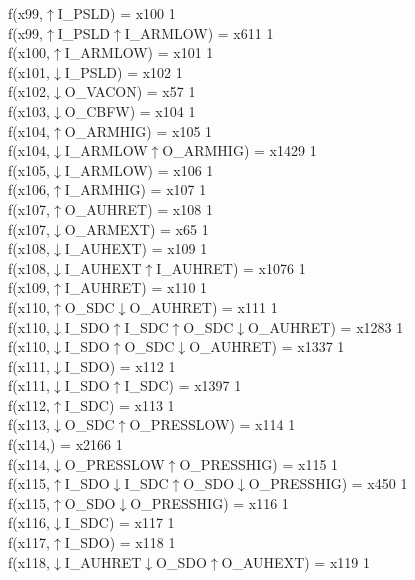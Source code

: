 f(x99,$\uparrow$I\_PSLD) = x100 {1} \\
f(x99,$\uparrow$I\_PSLD$\uparrow$I\_ARMLOW) = x611 {1} \\
f(x100,$\uparrow$I\_ARMLOW) = x101 {1} \\
f(x101,$\downarrow$I\_PSLD) = x102 {1} \\
f(x102,$\downarrow$O\_VACON) = x57 {1} \\
f(x103,$\downarrow$O\_CBFW) = x104 {1} \\
f(x104,$\uparrow$O\_ARMHIG) = x105 {1} \\
f(x104,$\downarrow$I\_ARMLOW$\uparrow$O\_ARMHIG) = x1429 {1} \\
f(x105,$\downarrow$I\_ARMLOW) = x106 {1} \\
f(x106,$\uparrow$I\_ARMHIG) = x107 {1} \\
f(x107,$\uparrow$O\_AUHRET) = x108 {1} \\
f(x107,$\downarrow$O\_ARMEXT) = x65 {1} \\
f(x108,$\downarrow$I\_AUHEXT) = x109 {1} \\
f(x108,$\downarrow$I\_AUHEXT$\uparrow$I\_AUHRET) = x1076 {1} \\
f(x109,$\uparrow$I\_AUHRET) = x110 {1} \\
f(x110,$\uparrow$O\_SDC$\downarrow$O\_AUHRET) = x111 {1} \\
f(x110,$\downarrow$I\_SDO$\uparrow$I\_SDC$\uparrow$O\_SDC$\downarrow$O\_AUHRET) = x1283 {1} \\
f(x110,$\downarrow$I\_SDO$\uparrow$O\_SDC$\downarrow$O\_AUHRET) = x1337 {1} \\
f(x111,$\downarrow$I\_SDO) = x112 {1} \\
f(x111,$\downarrow$I\_SDO$\uparrow$I\_SDC) = x1397 {1} \\
f(x112,$\uparrow$I\_SDC) = x113 {1} \\
f(x113,$\downarrow$O\_SDC$\uparrow$O\_PRESSLOW) = x114 {1} \\
f(x114,) = x2166 {1} \\
f(x114,$\downarrow$O\_PRESSLOW$\uparrow$O\_PRESSHIG) = x115 {1} \\
f(x115,$\uparrow$I\_SDO$\downarrow$I\_SDC$\uparrow$O\_SDO$\downarrow$O\_PRESSHIG) = x450 {1} \\
f(x115,$\uparrow$O\_SDO$\downarrow$O\_PRESSHIG) = x116 {1} \\
f(x116,$\downarrow$I\_SDC) = x117 {1} \\
f(x117,$\uparrow$I\_SDO) = x118 {1} \\
f(x118,$\downarrow$I\_AUHRET$\downarrow$O\_SDO$\uparrow$O\_AUHEXT) = x119 {1} \\
